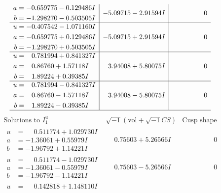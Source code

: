 \documentclass[1p]{elsarticle_modified}
\theoremstyle{definition}
\newcommand{\I}{\sqrt{-1}}
\begin{document}
$$\begin{array}{c|c|c}
\begin{aligned}
a &= -0.659775 - 0.129486 I \\
b &= -1.298270 - 0.503505 I\end{aligned}
 & -5.09715 - 2.91594 I & \phantom{-0.000000 } 0 \\ \hline\begin{aligned}
u &= -0.407542 - 1.071160 I \\
a &= -0.659775 + 0.129486 I \\
b &= -1.298270 + 0.503505 I\end{aligned}
 & -5.09715 + 2.91594 I & \phantom{-0.000000 } 0 \\ \hline\begin{aligned}
u &= \phantom{-}0.781994 + 0.841327 I \\
a &= \phantom{-}0.86760 + 1.57118 I \\
b &= \phantom{-}1.89224 + 0.39385 I\end{aligned}
 & \phantom{-}3.94008 + 5.80075 I & \phantom{-0.000000 } 0 \\ \hline\begin{aligned}
u &= \phantom{-}0.781994 - 0.841327 I \\
a &= \phantom{-}0.86760 - 1.57118 I \\
b &= \phantom{-}1.89224 - 0.39385 I\end{aligned}
 & \phantom{-}3.94008 - 5.80075 I & \phantom{-0.000000 } 0\\
 \hline 
 \end{array}$$\newpage$$\begin{array}{c|c|c}  
\text{Solutions to }I^u_{1}& \I (\text{vol} + \sqrt{-1}CS) & \text{Cusp shape}\\
 \hline 
\begin{aligned}
u &= \phantom{-}0.511774 + 1.029730 I \\
a &= -1.36061 + 0.55979 I \\
b &= -1.96792 + 1.14221 I\end{aligned}
 & \phantom{-}0.75603 + 5.26566 I & \phantom{-0.000000 } 0 \\ \hline\begin{aligned}
u &= \phantom{-}0.511774 - 1.029730 I \\
a &= -1.36061 - 0.55979 I \\
b &= -1.96792 - 1.14221 I\end{aligned}
 & \phantom{-}0.75603 - 5.26566 I & \phantom{-0.000000 } 0 \\ \hline\begin{aligned}
u &= \phantom{-}0.142818 + 1.148110 I \\

\end{aligned}
\end{array}$$
\end{document}
